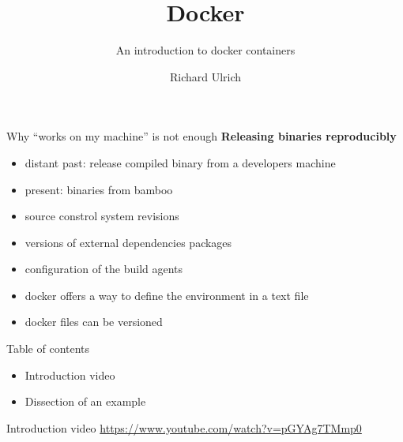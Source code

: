 \documentclass[11pt, aspectratio=169]{beamer}
\author{Richard Ulrich}
\title{Docker}
\subtitle{An introduction to docker containers}
\institute{BORM Informatik AG}
\begin{document}
\begin{frame}
\titlepage
\end{frame}

\begin{frame}{Why ``works on my machine'' is not enough}
\textbf{Releasing binaries reproducibly}
\begin{itemize}
\item distant past: release compiled binary from a developers machine
\item present: binaries from bamboo
\item source constrol system revisions
\item versions of external dependencies packages
\item configuration of the build agents
\item docker offers a way to define the environment in a text file
\item docker files can be versioned
\end{itemize}
\end{frame}

\begin{frame}{Table of contents}
\begin{itemize}
\item Introduction video
\item Dissection of an example
\end{itemize}
\end{frame}

\begin{frame}{Introduction video}
\centering
{}
\url{https://www.youtube.com/watch?v=pGYAg7TMmp0}
\end{frame}
\end{document}

